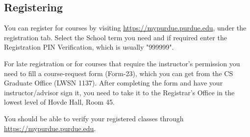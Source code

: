 \subsection{Registering}

You can register for courses by visiting \url{https://mypurdue.purdue.edu}, under the registration tab. Select the School term you need and if required enter the Registration PIN Verification, which is usually "999999".

For late registration or for courses that require the instructor's permission you need to fill a course-request form (Form-23), which you can get from the CS Graduate Office (LWSN 1137). After completing the form and have your instructor/advisor sign it, you need to take it to the Registrar's Office in the lowest level of Hovde Hall, Room 45.

You should be able to verify your registered classes through \url{https://mypurdue.purdue.edu}.